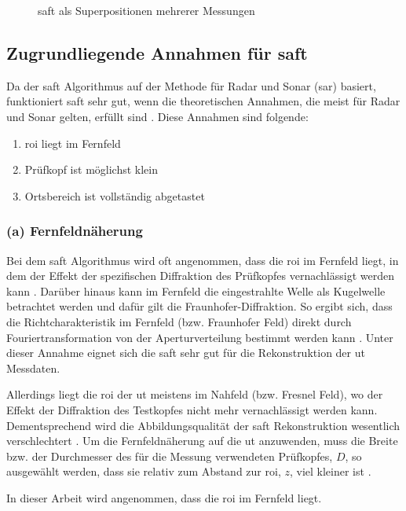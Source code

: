 \begin{figure}[h!]
\begin{center}
\caption[SAFT Superposition]{\acrshort{saft} als Superpositionen mehrerer Messungen}
\label{fig:superposition}
\end{center}
\end{figure}


\subsection{Zugrundliegende Annahmen für \acrshort{saft}} \label{sec:SAFTassumption}
Da der \acrshort{saft} Algorithmus auf der Methode für Radar und Sonar (\acrfull{sar}) basiert, funktioniert \acrshort{saft} sehr gut, wenn die theoretischen Annahmen, die meist für Radar und Sonar gelten, erfüllt sind \cite{Lingvall04PhD} \cite{Stepinski10SAFTreview}. Diese Annahmen sind folgende:
\begin{enumerate} [label=(\alph*)]
	\item \acrshort{roi} liegt im Fernfeld
	\item Prüfkopf ist möglichst klein
	\item Ortsbereich ist vollständig abgetastet
\end{enumerate}

\subsubsection*{(a) Fernfeldnäherung} \label{sec:farfield} %
Bei dem \acrshort{saft} Algorithmus wird oft angenommen, dass die \acrshort{roi} im Fernfeld liegt, in dem der Effekt der spezifischen Diffraktion des Prüfkopfes vernachlässigt werden kann \cite{Stepinski10SAFTreview}.
Darüber hinaus kann im Fernfeld die eingestrahlte Welle als Kugelwelle betrachtet werden und dafür gilt die Fraunhofer-Diffraktion. So ergibt sich, dass die Richtcharakteristik im Fernfeld (bzw. Fraunhofer Feld) direkt durch Fouriertransformation von der Aperturverteilung bestimmt werden kann\cite{Goodman68FourierOptics} \cite{Lu94MedBeamForming}. Unter dieser Annahme eignet sich die \acrshort{saft} sehr gut für die Rekonstruktion der \acrshort{ut} Messdaten. \par
Allerdings liegt die \acrshort{roi} der \acrshort{ut} meistens im Nahfeld (bzw. Fresnel Feld), wo der Effekt der Diffraktion des Testkopfes nicht mehr vernachlässigt werden kann. Dementsprechend wird die Abbildungsqualität der \acrshort{saft} Rekonstruktion wesentlich verschlechtert \cite{Stepinski10SAFTreview}. Um die Fernfeldnäherung auf die \acrshort{ut} anzuwenden, muss die Breite bzw. der Durchmesser des für die Messung verwendeten Prüfkopfes, $D$,  so ausgewählt werden, dass sie relativ zum Abstand zur \acrshort{roi}, $z$, viel kleiner ist \cite{Stepinski10SAFTreview}. \par
In dieser Arbeit wird angenommen, dass die \acrshort{roi} im Fernfeld liegt. \par


